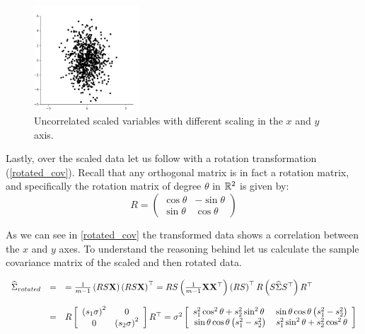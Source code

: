 \begin{figure}[H]
	\centering
	\includegraphics[width=0.35\textwidth]{chapters/mathematical.basis/figures/scaled_cov.png}
	\caption{Uncorrelated scaled variables with different scaling in the $x$ and $y$ axis. \GitChapterOneExamples}
	\label{scaled_cov}
\end{figure}

Lastly, over the scaled data let us follow with a rotation transformation (\autoref{rotated_cov}). Recall that any orthogonal matrix is in fact a rotation matrix, and specifically the rotation matrix of degree $\theta $ in $\mathbb{R}^2$ is given by:
$$R = \left( \begin{array}{ccc}  \cos\theta  & -\sin\theta  \\  \sin\theta  & \cos\theta  \end{array} \right)$$

As we can see in \autoref{rotated_cov} the transformed data shows a correlation between the $x$ and $y$ axes. To understand the reasoning behind let us calculate the sample covariance matrix of the scaled and then rotated data.

$$
\begin{array}{ccl}
	\widehat{\Sigma}_{rotated} & = & =\frac{1}{m-1}\left(RS\mathbf{X}\right)\left(RS\mathbf{X}\right)^{\top}=RS\left(\frac{1}{m-1}\mathbf{X}\mathbf{X}^{\top}\right)\left(RS\right)^{\top}R\left(S\widehat{\Sigma}S^{\top}\right)R^{\top}\\
	\\
	& = & R\left[\begin{array}{cc}
		\left(s_{1}\sigma\right)^{2} & 0\\
		0 & \left(s_{2}\sigma\right)^{2}
	\end{array}\right]R^{\top}=\sigma^{2}\left[\begin{array}{cc}
		s_{1}^{2}\cos^{2}\theta+s_{2}^{2}\sin^{2}\theta\,\, & \sin\theta\cos\theta\left(s_{1}^{2}-s_{2}^{2}\right)\\
		\sin\theta\cos\theta\left(s_{1}^{2}-s_{2}^{2}\right) & s_{1}^{2}\sin^{2}\theta+s_{2}^{2}\cos^{2}\theta
	\end{array}\right]
\end{array}
$$

